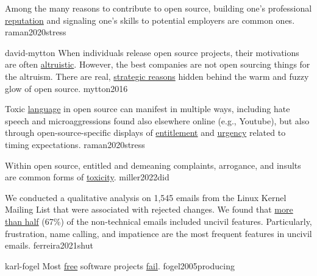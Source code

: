 \documentclass{article}
\begin{document}


  {Among the many reasons to contribute to open source, building one's professional \ul{reputation} and signaling one's skills to potential employers are common ones.}
  {raman2020stress}

\qte
  {david-mytton}
  {When individuals release open source projects, their motivations are often \ul{altruistic}. However, the best companies are not open sourcing things for the altruism. There are real, \ul{strategic reasons} hidden behind the warm and fuzzy glow of open source.}
  {mytton2016}


  {Toxic \ul{language} in open source can manifest in multiple ways, including hate speech and microaggressions found also elsewhere online (e.g., Youtube), but also through open-source-specific displays of \ul{entitlement} and \ul{urgency} related to timing expectations.}
  {raman2020stress}

  {Within open source, entitled and demeaning complaints, arrogance, and insults are common forms of \ul{toxicity}.}
  {miller2022did}

  {We conducted a qualitative analysis on 1,545 emails from the Linux Kernel Mailing List that were associated with rejected changes. We found that \ul{more than half} (67\%) of the non-technical emails included uncivil features. Particularly, frustration, name calling, and impatience are the most frequent features in uncivil emails. }
  {ferreira2021shut}


\qte
  {karl-fogel}
  {Most \ul{free} software projects \ul{fail}.}
  {fogel2005producing}
\end{document}
